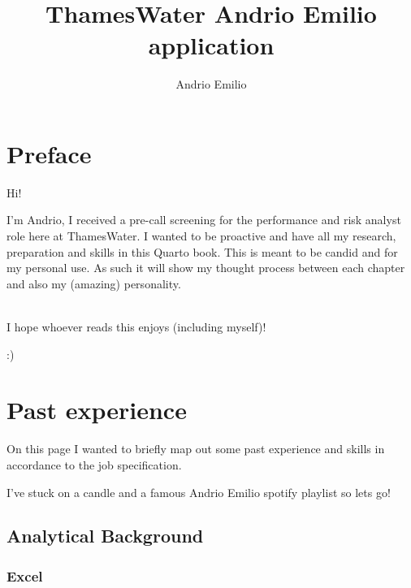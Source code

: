 \documentclass[
  letterpaper,
]{scrbook}
\title{ThamesWater Andrio Emilio application}
\author{Andrio Emilio}
\date{}
\renewcommand*\contentsname{Table of contents}
\newcommand\contentsname{Table of contents}
\begin{document}
\frontmatter
\maketitle

\renewcommand*\contentsname{Table of contents}
{
\setcounter{tocdepth}{2}
\tableofcontents
}
\mainmatter
{}

\chapter*{Preface}\label{preface}


Hi!

I'm Andrio, I received a pre-call screening for the performance and risk
analyst role here at ThamesWater. I wanted to be proactive and have all
my research, preparation and skills in this Quarto book. This is meant
to be candid and for my personal use. As such it will show my thought
process between each chapter and also my (amazing) personality.\\
\strut \\
I hope whoever reads this enjoys (including myself)!

:)


\chapter{Past experience}\label{past-experience}

On this page I wanted to briefly map out some past experience and skills
in accordance to the job specification.

I've stuck on a candle and a famous Andrio Emilio spotify playlist so
lets go!

\section{Analytical Background}\label{analytical-background}

\subsection{Excel}\label{excel}
\end{document}

